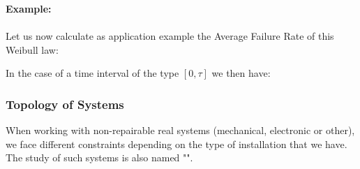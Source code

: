	
	\begin{tcolorbox}[colframe=black,colback=white,sharp corners]
	\textbf{{\Large {}}Example:}\\\\
	Let us now calculate as application example the Average Failure Rate of this Weibull law:
	
	In the case of a time interval of the type $[0,\tau]$ we then have:
	
	\end{tcolorbox}
	
	\pagebreak
	\subsubsection{Topology of Systems}
	When working with non-repairable real systems (mechanical, electronic or other), we face different constraints depending on the type of installation that we have. The study of such systems is also named "".
	
